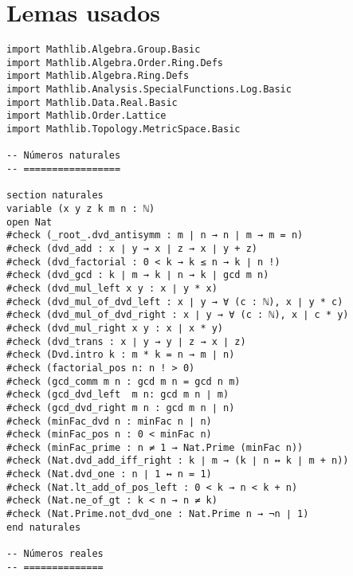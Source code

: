 

\chapter*{Lemas usados}
\begin{verbatim}
import Mathlib.Algebra.Group.Basic
import Mathlib.Algebra.Order.Ring.Defs
import Mathlib.Algebra.Ring.Defs
import Mathlib.Analysis.SpecialFunctions.Log.Basic
import Mathlib.Data.Real.Basic
import Mathlib.Order.Lattice
import Mathlib.Topology.MetricSpace.Basic

-- Números naturales
-- =================

section naturales
variable (x y z k m n : ℕ)
open Nat
#check (_root_.dvd_antisymm : m ∣ n → n ∣ m → m = n)
#check (dvd_add : x ∣ y → x ∣ z → x ∣ y + z)
#check (dvd_factorial : 0 < k → k ≤ n → k ∣ n !)
#check (dvd_gcd : k ∣ m → k ∣ n → k ∣ gcd m n)
#check (dvd_mul_left x y : x ∣ y * x)
#check (dvd_mul_of_dvd_left : x ∣ y → ∀ (c : ℕ), x ∣ y * c)
#check (dvd_mul_of_dvd_right : x ∣ y → ∀ (c : ℕ), x ∣ c * y)
#check (dvd_mul_right x y : x ∣ x * y)
#check (dvd_trans : x ∣ y → y ∣ z → x ∣ z)
#check (Dvd.intro k : m * k = n → m ∣ n)
#check (factorial_pos n: n ! > 0)
#check (gcd_comm m n : gcd m n = gcd n m)
#check (gcd_dvd_left  m n: gcd m n ∣ m)
#check (gcd_dvd_right m n : gcd m n ∣ n)
#check (minFac_dvd n : minFac n ∣ n)
#check (minFac_pos n : 0 < minFac n)
#check (minFac_prime : n ≠ 1 → Nat.Prime (minFac n))
#check (Nat.dvd_add_iff_right : k ∣ m → (k ∣ n ↔ k ∣ m + n))
#check (Nat.dvd_one : n ∣ 1 ↔ n = 1)
#check (Nat.lt_add_of_pos_left : 0 < k → n < k + n)
#check (Nat.ne_of_gt : k < n → n ≠ k)
#check (Nat.Prime.not_dvd_one : Nat.Prime n → ¬n ∣ 1)
end naturales

-- Números reales
-- ==============


\end{verbatim}
